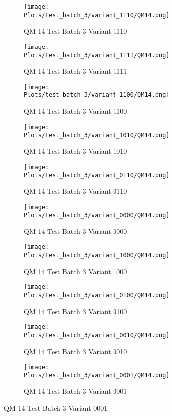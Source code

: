 \documentclass{DissertateFigs}
\begin{document}
\begin{figure}[t!]
    \begin{subfigure}{0.47\textwidth}
    \texttt{[image: Plots/test\_batch\_3/variant\_1110/QM14.png]}
    \caption{QM 14 Test Batch 3 Variant 1110}
    \end{subfigure}
    \begin{subfigure}{0.47\textwidth}
    \texttt{[image: Plots/test\_batch\_3/variant\_1111/QM14.png]}
    \caption{QM 14 Test Batch 3 Variant 1111}
    \end{subfigure}

\medskip

    \begin{subfigure}{0.47\textwidth}
    \texttt{[image: Plots/test\_batch\_3/variant\_1100/QM14.png]}
    \caption{QM 14 Test Batch 3 Variant 1100}
    \end{subfigure}
    \begin{subfigure}{0.47\textwidth}
    \texttt{[image: Plots/test\_batch\_3/variant\_1010/QM14.png]}
    \caption{QM 14 Test Batch 3 Variant 1010}
    \end{subfigure}

\medskip

    \begin{subfigure}{0.47\textwidth}
    \texttt{[image: Plots/test\_batch\_3/variant\_0110/QM14.png]}
    \caption{QM 14 Test Batch 3 Variant 0110}
    \end{subfigure}
    \begin{subfigure}{0.47\textwidth}
    \texttt{[image: Plots/test\_batch\_3/variant\_0000/QM14.png]}
    \caption{QM 14 Test Batch 3 Variant 0000}
    \end{subfigure}

\medskip

    \begin{subfigure}{0.47\textwidth}
    \texttt{[image: Plots/test\_batch\_3/variant\_1000/QM14.png]}
    \caption{QM 14 Test Batch 3 Variant 1000}
    \end{subfigure}
    \begin{subfigure}{0.47\textwidth}
    \texttt{[image: Plots/test\_batch\_3/variant\_0100/QM14.png]}
    \caption{QM 14 Test Batch 3 Variant 0100}
    \end{subfigure}

\medskip

    \begin{subfigure}{0.47\textwidth}
    \texttt{[image: Plots/test\_batch\_3/variant\_0010/QM14.png]}
    \caption{QM 14 Test Batch 3 Variant 0010}
    \end{subfigure}
    \begin{subfigure}{0.47\textwidth}
    \texttt{[image: Plots/test\_batch\_3/variant\_0001/QM14.png]}
    \caption{QM 14 Test Batch 3 Variant 0001}
    \end{subfigure}


\end{figure}
\end{document}
